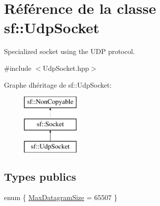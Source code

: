 \hypertarget{classsf_1_1UdpSocket}{}\section{Référence de la classe sf\+:\+:Udp\+Socket}
\label{classsf_1_1UdpSocket}


Specialized socket using the U\+DP protocol.  




{\ttfamily \#include $<$Udp\+Socket.\+hpp$>$}

Graphe d\textquotesingle{}héritage de sf\+:\+:Udp\+Socket\+:\begin{figure}[H]
\begin{center}
\leavevmode
\includegraphics[height=3.000000cm]{classsf_1_1UdpSocket}
\end{center}
\end{figure}
\subsection*{Types publics}
\begin{DoxyCompactItemize}
\item 
enum \{ \hyperlink{classsf_1_1UdpSocket_a14c7b7816e33ed1ef1f2fdb2404c06b5a728a7d33027bee0d65f70f964dd9c9eb}{Max\+Datagram\+Size} = 65507
 \}
\end{DoxyCompactItemize}
